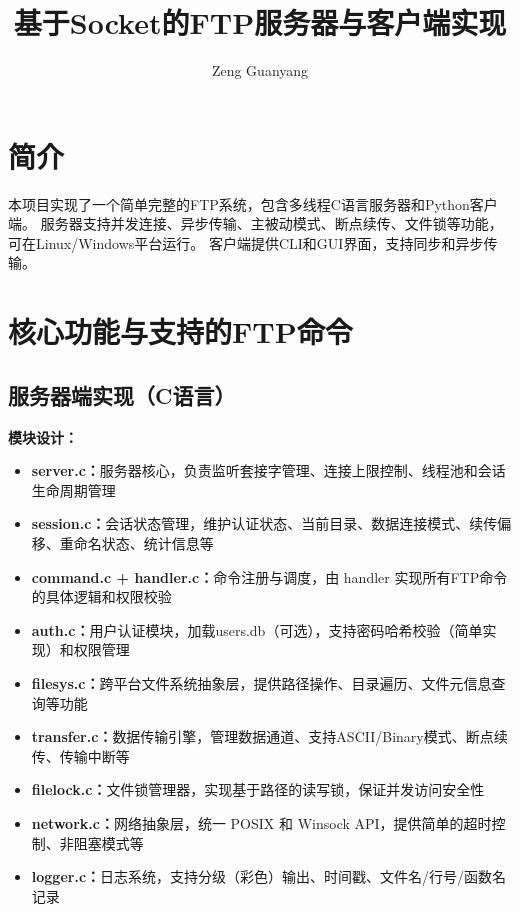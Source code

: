 \documentclass[11pt,a4paper]{article}
\title{\textbf{基于Socket的FTP服务器与客户端实现}}
\author{Zeng Guanyang}
\date{}
\begin{document}
\maketitle
\vspace{-2.5em}

\section{简介}

本项目实现了一个简单完整的FTP系统，包含多线程C语言服务器和Python客户端。
服务器支持并发连接、异步传输、主被动模式、断点续传、文件锁等功能，可在Linux/Windows平台运行。
客户端提供CLI和GUI界面，支持同步和异步传输。

\section{核心功能与支持的FTP命令}

\subsection{服务器端实现（C语言）}

\textbf{模块设计：}
\begin{itemize}[itemsep=0pt]
    \item \textbf{server.c：}服务器核心，负责监听套接字管理、连接上限控制、线程池和会话生命周期管理
    \item \textbf{session.c：}会话状态管理，维护认证状态、当前目录、数据连接模式、续传偏移、重命名状态、统计信息等
    \item \textbf{command.c + handler.c：}命令注册与调度，由 handler 实现所有FTP命令的具体逻辑和权限校验
    \item \textbf{auth.c：}用户认证模块，加载users.db（可选），支持密码哈希校验（简单实现）和权限管理
    \item \textbf{filesys.c：}跨平台文件系统抽象层，提供路径操作、目录遍历、文件元信息查询等功能
    \item \textbf{transfer.c：}数据传输引擎，管理数据通道、支持ASCII/Binary模式、断点续传、传输中断等
    \item \textbf{filelock.c：}文件锁管理器，实现基于路径的读写锁，保证并发访问安全性
    \item \textbf{network.c：}网络抽象层，统一 POSIX 和 Winsock API，提供简单的超时控制、非阻塞模式等
    \item \textbf{logger.c：}日志系统，支持分级（彩色）输出、时间戳、文件名/行号/函数名记录
\end{itemize}
\end{document}
